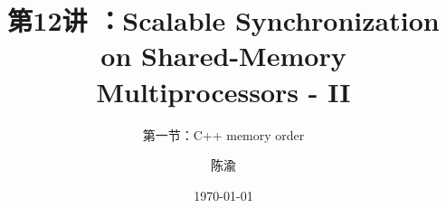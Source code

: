 


\title[第12讲]{第12讲 ：Scalable Synchronization on Shared-Memory Multiprocessors - II} %
\subtitle{第一节：C++ memory order }
\author{陈渝} %
\date{\today} %





\begin{frame}
\titlepage %
\end{frame}

